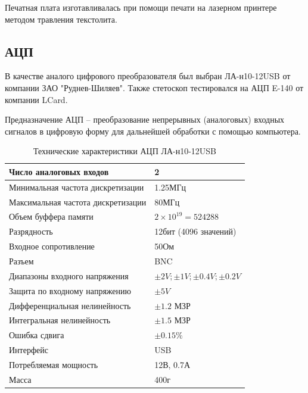 \documentclass[14pt]{extarticle}
\begin{document}
Печатная плата изготавливалась при помощи печати на лазерном принтере методом травления текстолита. 
\subsection{АЦП}
В качестве аналого цифрового преобразователя был выбран ЛА-н10-12USB от компании ЗАО "Руднев-Шиляев". Также стетоскоп тестировался на АЦП E-140 от компании LCard. 

Предназначение АЦП – преобразование непрерывных (аналоговых) входных сигналов в цифровую форму для дальнейшей обработки с помощью компьютера.

\begin{table}[h]
\centering
\label{my-label}
\begin{tabular}{|l|l|}
                                                                      \hline
Число аналоговых входов            & 2                             \\ \hline
Минимальная частота дискретизации  & 1.25МГц                       \\ \hline
Максимальная частота дискретизации & 80МГц                         \\ \hline
Объем буффера памяти               & $2\times10^{19}=524288$       \\ \hline
Разрядность                        & 12бит (4096 значений)         \\ \hline
Входное сопротивление              & 50Ом                          \\ \hline
Разъем                             & BNC                           \\ \hline
Диапазоны входного напряжения      & $\pm2V;\pm1V;\pm0.4V;\pm0.2V$ \\ \hline
Защита по входному напряжению      & $\pm5V$                       \\ \hline
Дифференциальная нелинейность      & $\pm1.2$ МЗР                  \\ \hline
Интегральная нелинейность          & $\pm1.5$ МЗР                  \\ \hline
Ошибка сдвига                      & $\pm0.15\%$                   \\ \hline
Интерфейс                          & USB                           \\ \hline
Потребляемая мощность              & 12В, 0.7А                     \\ \hline
Масса                              & 400г                          \\ \hline
\end{tabular}
\caption{Технические характеристики АЦП ЛА-н10-12USB}
\end{table}
\end{document}
